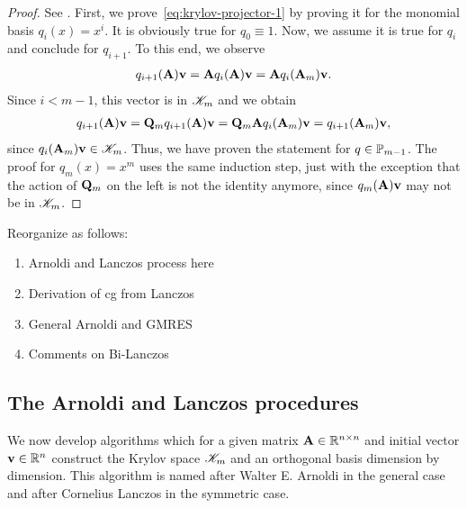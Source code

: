 \begin{proof}
  See \cite[Proposition 6.3]{Saad00}.  First, we
  prove~\eqref{eq:krylov-projector-1} by proving it for the monomial
  basis $q_i(x) = x^i$. It is obviously true for $q_0\equiv 1$. Now,
  we assume it is true for $q_i$ and conclude for $q_{i+1}$. To this
  end, we observe
  \begin{gather}
    q_{i+1}(\mata)\vv = \mata q_i(\mata)\vv = \mata q_i(\mata_m)\vv.
  \end{gather}
  Since $i<m-1$, this vector is in $\krylov_m$ and we obtain
  \begin{gather}
    q_{i+1}(\mata)\vv
    = \matq_m q_{i+1}(\mata)\vv
    = \matq_m \mata q_i(\mata_m)\vv
    = q_{i+1}(\mata_m)\vv,
  \end{gather}
  since $q_i(\mata_m)\vv\in\krylov_m$. Thus, we have proven the
  statement for $q\in\P_{m-1}$. The proof for $q_{m}(x) = x^m$ uses
  the same induction step, just with the exception that the action of
  $\matq_m$ on the left is not the identity anymore, since
  $q_m(\mata)\vv$ may not be in $\krylov_m$.
\end{proof}

\begin{todo}
  Reorganize as follows:
  \begin{enumerate}
  \item Arnoldi and Lanczos process here
  \item Derivation of cg from Lanczos
  \item General Arnoldi and GMRES
  \item Comments on Bi-Lanczos
  \end{enumerate}
\end{todo}

\subsection{The Arnoldi and Lanczos procedures}

\begin{intro}
  We now develop algorithms which for a given matrix $\mata\in\Rnn$
  and initial vector $\vv\in\R^n$ construct the Krylov space
  $\krylov_m$ and an orthogonal basis dimension by dimension. This
  algorithm is named after Walter E. Arnoldi in the general case and
  after Cornelius Lanczos in the symmetric case.
\end{intro}

